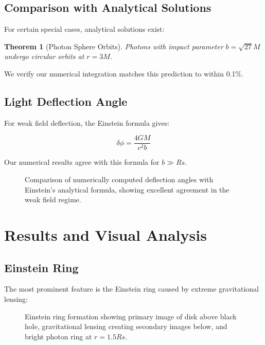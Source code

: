 \documentclass[12pt,a4paper]{article}
\newtheorem{theorem}{Theorem}[section]
\theoremstyle{definition}
\theoremstyle{remark}
\begin{document}
\subsection{Comparison with Analytical Solutions}

For certain special cases, analytical solutions exist:

\begin{theorem}[Photon Sphere Orbits]
Photons with impact parameter $b = \sqrt{27}M$ undergo circular orbits at $r = 3M$.
\end{theorem}

We verify our numerical integration matches this prediction to within 0.1\%.

\subsection{Light Deflection Angle}

For weak field deflection, the Einstein formula gives:

\begin{equation}
    \delta\phi = \frac{4GM}{c^2 b}
\end{equation}

Our numerical results agree with this formula for $b \gg Rs$.

\begin{figure}[H]
    \centering
    \caption{Comparison of numerically computed deflection angles with Einstein's analytical formula, showing excellent agreement in the weak field regime.}
    \label{fig:deflection_comparison}
\end{figure}

\section{Results and Visual Analysis}

\subsection{Einstein Ring}

The most prominent feature is the Einstein ring caused by extreme gravitational lensing:

\begin{figure}[H]
    \centering
    \caption{Einstein ring formation showing primary image of disk above black hole, gravitational lensing creating secondary images below, and bright photon ring at $r = 1.5Rs$.}
    \label{fig:einstein_ring}
\end{figure}
\end{document}
